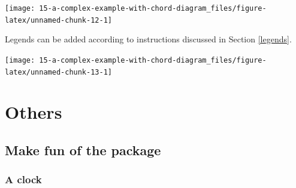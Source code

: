 \documentclass[]{book}
\newenvironment{Shaded}{\begin{snugshade}}{\end{snugshade}}
\newcommand{\KeywordTok}[1]{\textcolor[rgb]{0.13,0.29,0.53}{\textbf{#1}}}
\newcommand{\DataTypeTok}[1]{\textcolor[rgb]{0.13,0.29,0.53}{#1}}
\newcommand{\DecValTok}[1]{\textcolor[rgb]{0.00,0.00,0.81}{#1}}
\newcommand{\FloatTok}[1]{\textcolor[rgb]{0.00,0.00,0.81}{#1}}
\newcommand{\StringTok}[1]{\textcolor[rgb]{0.31,0.60,0.02}{#1}}
\newcommand{\OperatorTok}[1]{\textcolor[rgb]{0.81,0.36,0.00}{\textbf{#1}}}
\newcommand{\NormalTok}[1]{#1}
\theoremstyle{definition}
\theoremstyle{definition}
\theoremstyle{remark}
\begin{document}
\begin{Shaded}
\end{Shaded}

\begin{center}\texttt{[image: 15-a-complex-example-with-chord-diagram\_files/figure-latex/unnamed-chunk-12-1]} \end{center}

Legends can be added according to instructions discussed in Section
\ref{legends}.

\begin{center}\texttt{[image: 15-a-complex-example-with-chord-diagram\_files/figure-latex/unnamed-chunk-13-1]} \end{center}

\part{Others}\label{part-others}

\chapter{Make fun of the package}\label{make-fun-of-the-package}

\section{A clock}\label{a-clock}
\end{document}
